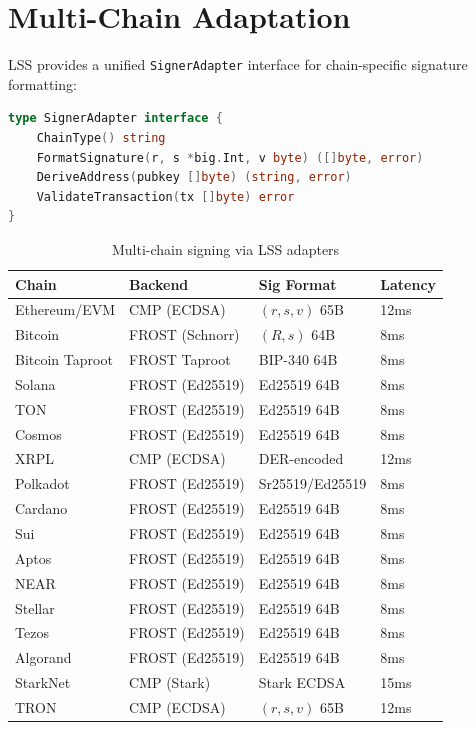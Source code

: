 \documentclass[11pt]{article}
\begin{document}
\section{Multi-Chain Adaptation}

LSS provides a unified \texttt{SignerAdapter} interface for chain-specific signature formatting:

\begin{lstlisting}[language=Go,basicstyle=\ttfamily\scriptsize]
type SignerAdapter interface {
    ChainType() string
    FormatSignature(r, s *big.Int, v byte) ([]byte, error)
    DeriveAddress(pubkey []byte) (string, error)
    ValidateTransaction(tx []byte) error
}
\end{lstlisting}

\begin{table}[h]
\centering
\scriptsize
\begin{tabular}{llll}
\toprule
\textbf{Chain} & \textbf{Backend} & \textbf{Sig Format} & \textbf{Latency} \\
\midrule
Ethereum/EVM & CMP (ECDSA) & $(r, s, v)$ 65B & 12ms \\
Bitcoin & FROST (Schnorr) & $(R, s)$ 64B & 8ms \\
Bitcoin Taproot & FROST Taproot & BIP-340 64B & 8ms \\
Solana & FROST (Ed25519) & Ed25519 64B & 8ms \\
TON & FROST (Ed25519) & Ed25519 64B & 8ms \\
Cosmos & FROST (Ed25519) & Ed25519 64B & 8ms \\
XRPL & CMP (ECDSA) & DER-encoded & 12ms \\
Polkadot & FROST (Ed25519) & Sr25519/Ed25519 & 8ms \\
Cardano & FROST (Ed25519) & Ed25519 64B & 8ms \\
Sui & FROST (Ed25519) & Ed25519 64B & 8ms \\
Aptos & FROST (Ed25519) & Ed25519 64B & 8ms \\
NEAR & FROST (Ed25519) & Ed25519 64B & 8ms \\
Stellar & FROST (Ed25519) & Ed25519 64B & 8ms \\
Tezos & FROST (Ed25519) & Ed25519 64B & 8ms \\
Algorand & FROST (Ed25519) & Ed25519 64B & 8ms \\
StarkNet & CMP (Stark) & Stark ECDSA & 15ms \\
TRON & CMP (ECDSA) & $(r, s, v)$ 65B & 12ms \\
\bottomrule
\end{tabular}
\caption{Multi-chain signing via LSS adapters}
\label{tab:chains}
\end{table}
\end{document}
